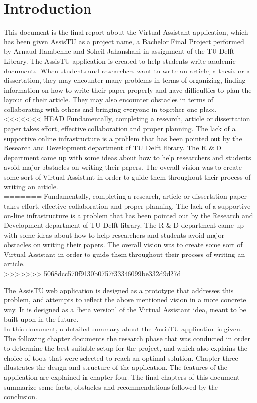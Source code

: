 \chapter{Introduction}

This document is the final report about the Virtual Assistant application, which has been given AssisTU as a project name, a Bachelor Final Project performed by Arnaud Hambenne and Soheil Jahanshahi in assignment of the TU Delft Library. The AssisTU application is created to help students write academic documents. When students and researchers want to write an article, a thesis or a dissertation, they may encounter many problems in terms of organizing, finding information on how to write their paper properly and have difficulties to plan the layout of their article. They may also encounter obstacles in terms of collaborating with others and bringing everyone in together one 
place. \\

<<<<<<< HEAD
Fundamentally, completing a research, article or dissertation paper takes effort, effective collaboration and proper planning. The lack of a supportive online infrastructure is a problem that has been pointed out by the Research and Development department of TU Delft library. The R \& D department came up with some ideas about how to help researchers and students avoid major obstacles on writing their papers. The overall vision was to create some sort of Virtual Assistant in order to guide them throughout their process of writing an article.\\
=======
Fundamentally, completing a research, article or dissertation paper takes effort, effective collaboration and proper planning. The lack of a supportive
on-line infrastructure is a problem that has been pointed out by the Research and Development department of TU Delft library. The R \& D department came 
up with some ideas about how to help researchers and students avoid major obstacles on writing their papers. The overall vision was to create some sort of Virtual Assistant in order to guide them throughout their process of writing an article.\\
>>>>>>> 5068dcc570f9130b0757f33346099be332d9d27d

The AssisTU web application is designed as a prototype that addresses this problem, and attempts to reflect the above mentioned vision in a more concrete way. It is designed as a `beta version' of the Virtual Assistant idea, meant to be built upon in the future.\\ 

In this document, a detailed summary about the AssisTU application is given. The following chapter documents the research phase that was conducted in order to determine the best suitable setup for the project, and which also explains the choice of tools that were selected to reach an optimal solution. 
Chapter three illustrates the design and structure of the application. The features of the application are explained in chapter four. The final chapters of this document summarize some facts, obstacles and recommendations followed by the conclusion.  